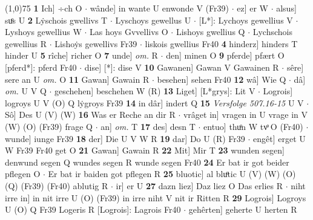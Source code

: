\documentclass[8pt,a4paper,notitlepage]{article}
\begin{document}
\begin{table}[ht]
\begin{minipage}[t]{0.5\linewidth}
\line(1,0){75} \newline
\textbf{1} Ich] ÷ch O  $\cdot$ wânde] in wante U enwonde V (Fr39)  $\cdot$ ez] er W  $\cdot$ alsus] suͦs U \textbf{2} Lẏschois gwellivs T  $\cdot$ Lyschoys gewellus U  $\cdot$ [L*]: Lychoys gewellius V  $\cdot$ Lyshoys gewellius W  $\cdot$ Las hoys Gvvellivs O  $\cdot$ Lishoys gwellius Q  $\cdot$ Lychschois gewellius R  $\cdot$ Lishoẏs gewellivs Fr39  $\cdot$ liskois gwellius Fr40 \textbf{4} hinderz] hinders T hinder U \textbf{5} rîche] richer O \textbf{7} unde] \textit{om.} R  $\cdot$ den] minen O \textbf{9} pferde] pfært O [pferd*]: pferd Fr40  $\cdot$ dise] [*]: dise V \textbf{10} Gawanen] Gawan V Gawainen R  $\cdot$ sêre] sere an U \textit{om.} O \textbf{11} Gawan] Gawain R  $\cdot$ besehen] sehen Fr40 \textbf{12} wâ] Wie Q  $\cdot$ dâ] \textit{om.} U V Q  $\cdot$ geschehen] beschehen W (R) \textbf{13} Liget] [L*grys]: Lit V  $\cdot$ Logrois] logroys U V (O) Q lẏgroys Fr39 \textbf{14} in dâr] indert Q \textbf{15} \textit{Versfolge 507.16-15} U V   $\cdot$ Sô] Des U (V) (W) \textbf{16} Was er Reche an dir R  $\cdot$ vrâget in] vragen in U vrage in V (W) (O) (Fr39) frage Q  $\cdot$ an] \textit{om.} T \textbf{17} des] desn T  $\cdot$ entuo] thuͦn W tvͦ O (Fr40)  $\cdot$ wunde] iunge Fr39 \textbf{18} der] Die U V W R \textbf{19} dar] Do U (R) Fr39  $\cdot$ engêt] erget U W Fr39 Fr40 get O \textbf{21} Gawan] Gawain R \textbf{22} Mit] Mir T \textbf{23} wunden segen] denwund segen Q wundes segen R wunde segen Fr40 \textbf{24} Er bat ir got beider pflegen O  $\cdot$ Er bat ir baiden got pflegen R \textbf{25} bluotic] al bluͦtic U (V) (W) (O) (Q) (Fr39) (Fr40) ablutig R  $\cdot$ ir] er U \textbf{27} dazn liez] Daz liez O Das erlies R  $\cdot$ niht irre in] in nit irre U (O) (Fr39) in irre niht V nit ir Ritten R \textbf{29} Logrois] Logroys U (O) Q Fr39 Logeris R [Logrois]: Lagrois Fr40  $\cdot$ gehêrten] geherte U herten R \newline
\end{minipage}
\end{table}
\end{document}
